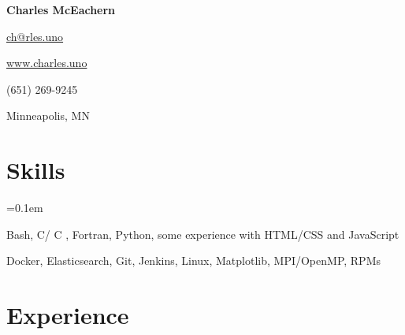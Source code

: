\documentclass[11pt,letterpaper]{article}
\newcommand{\ResumeSection}[1]{
    \section*{ {\color{MidnightBlue}#1 \sout{\hfill} } }
}
\newcommand{\URL}[1]{\href{#1}{#1}\xspace}
\newcommand{\CPP}{
    C\nolinebreak[4]\hspace{-.05em}\raisebox{.22ex}{\footnotesize\bf ++}\xspace
}
\newcommand{\hbump}{\hspace{0.4in}}
\newcommand{\hbmp}{\hspace{0.02in}}
\begin{document}


\begin{center}
    { \Huge \textbf{Charles McEachern} }

    \vspace{12pt}

    
    \hbmp
    \href{mailto:ch@rles.uno}{ch@rles.uno}
    \hbump
    
    \hbmp
    \URL{www.charles.uno}
    \hbump
    
    \hbmp
    (651) 269-9245
    \hbump
    
    \hbmp
    Minneapolis, MN


\end{center}


\ResumeSection{Skills}

\begin{description}[leftmargin=!, labelindent=\parindent,
                    labelwidth=\widthof{\bfseries Languages}]
    \parskip=0.1em

    \item[Languages]
        Bash, C/\CPP, Fortran, Python, some experience with HTML/CSS and JavaScript

    \item[Tools]
        Docker, Elasticsearch, Git, Jenkins, Linux, Matplotlib, MPI/OpenMP, RPMs

\end{description}



\ResumeSection{Experience}
\end{document}
